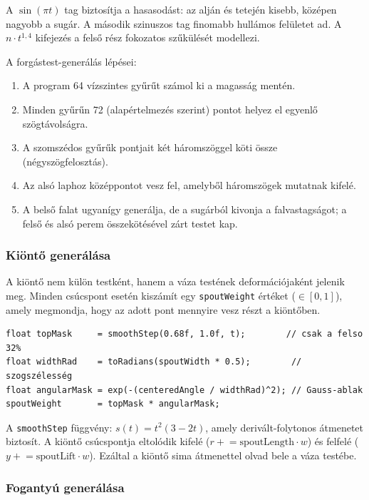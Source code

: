 \documentclass[12pt,a4paper]{article}
\newcommand{\code}[1]{\texttt{#1}}
\begin{document}
A $\sin(\pi t)$ tag biztosítja a hasasodást: az alján és tetején kisebb, középen
nagyobb a sugár. A második szinuszos tag finomabb hullámos felületet ad.
A $n \cdot t^{1{,}4}$ kifejezés a felső rész fokozatos szűkülését modellezi.

A forgástest-generálás lépései:
\begin{enumerate}
  \item A program 64 vízszintes gyűrűt számol ki a magasság mentén.
  \item Minden gyűrűn 72 (alapértelmezés szerint) pontot helyez el egyenlő
        szögtávolságra.
  \item A szomszédos gyűrűk pontjait két háromszöggel köti össze
        (négyszögfelosztás).
  \item Az alsó laphoz középpontot vesz fel, amelyből háromszögek mutatnak kifelé.
  \item A belső falat ugyanígy generálja, de a sugárból kivonja a falvastagságot;
        a felső és alsó perem összekötésével zárt testet kap.
\end{enumerate}

\subsubsection{Kiöntő generálása}

A kiöntő nem külön testként, hanem a váza testének deformációjaként jelenik meg.
Minden csúcspont esetén kiszámít egy \code{spoutWeight} értéket ($\in [0,1]$), amely
megmondja, hogy az adott pont mennyire vesz részt a kiöntőben.

\begin{lstlisting}[style=java, caption={A kiöntő súlymaszk-számítása (MathUtils.java)}]
float topMask     = smoothStep(0.68f, 1.0f, t);        // csak a felso 32%
float widthRad    = toRadians(spoutWidth * 0.5);        // szogszélesség
float angularMask = exp(-(centeredAngle / widthRad)^2); // Gauss-ablak
spoutWeight       = topMask * angularMask;
\end{lstlisting}

A \code{smoothStep} függvény: $s(t) = t^{2}(3 - 2t)$, amely derivált-folytonos
átmenetet biztosít. A kiöntő csúcspontja eltolódik kifelé
($r \mathrel{+}= \text{spoutLength} \cdot w$) és felfelé
($y \mathrel{+}= \text{spoutLift} \cdot w$). Ezáltal a kiöntő sima átmenettel olvad
bele a váza testébe.

\subsubsection{Fogantyú generálása}
\end{document}
